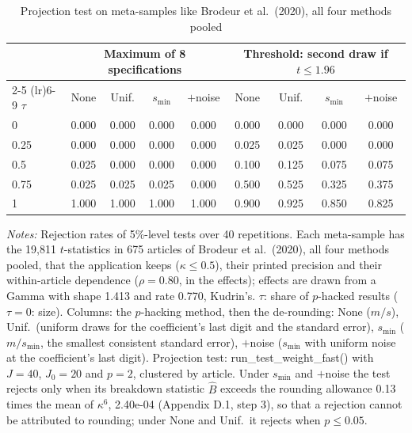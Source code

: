 \begin{table}[htbp]
\centering
\caption{Projection test on meta-samples like Brodeur et al.\ (2020), all four methods pooled}
\label{tab:brodeur_all_power_proj}
\footnotesize
\setlength{\tabcolsep}{4pt}
\begin{tabular}{lcccccccc}
\toprule
 & \multicolumn{4}{c}{Maximum of 8 specifications} & \multicolumn{4}{c}{Threshold: second draw if $t \le 1.96$} \\
\cmidrule(lr){2-5} \cmidrule(lr){6-9}
$\tau$ & None & Unif. & $s_{\min}$ & $+$noise & None & Unif. & $s_{\min}$ & $+$noise \\
\midrule
0 & 0.000 & 0.000 & 0.000 & 0.000 & 0.000 & 0.000 & 0.000 & 0.000 \\
0.25 & 0.000 & 0.000 & 0.000 & 0.000 & 0.025 & 0.025 & 0.000 & 0.000 \\
0.5 & 0.025 & 0.000 & 0.000 & 0.000 & 0.100 & 0.125 & 0.075 & 0.075 \\
0.75 & 0.025 & 0.025 & 0.025 & 0.000 & 0.500 & 0.525 & 0.325 & 0.375 \\
1 & 1.000 & 1.000 & 1.000 & 1.000 & 0.900 & 0.925 & 0.850 & 0.825 \\
\bottomrule
\end{tabular}
\par\smallskip
\begin{minipage}{\linewidth}\footnotesize\textit{Notes:} Rejection rates of 5\%-level tests over 40 repetitions. Each meta-sample has the 19{,}811 $t$-statistics in 675 articles of Brodeur et al.\ (2020), all four methods pooled, that the application keeps ($\kappa \le 0.5$), their printed precision and their within-article dependence ($\rho = 0.80$, in the effects); effects are drawn from a Gamma with shape 1.413 and rate 0.770, Kudrin's. $\tau$: share of $p$-hacked results ($\tau = 0$: size). Columns: the $p$-hacking method, then the de-rounding: None ($m/s$), Unif.\ (uniform draws for the coefficient's last digit and the standard error), $s_{\min}$ ($m/s_{\min}$, the smallest consistent standard error), $+$noise ($s_{\min}$ with uniform noise at the coefficient's last digit). Projection test: run\_test\_weight\_fast() with $J = 40$, $J_0 = 20$ and $p = 2$, clustered by article. Under $s_{\min}$ and $+$noise the test rejects only when its breakdown statistic $\hat B$ exceeds the rounding allowance 0.13 times the mean of $\kappa^6$, 2.40e-04 (Appendix D.1, step 3), so that a rejection cannot be attributed to rounding; under None and Unif.\ it rejects when $p \le 0.05$.\end{minipage}
\end{table}
